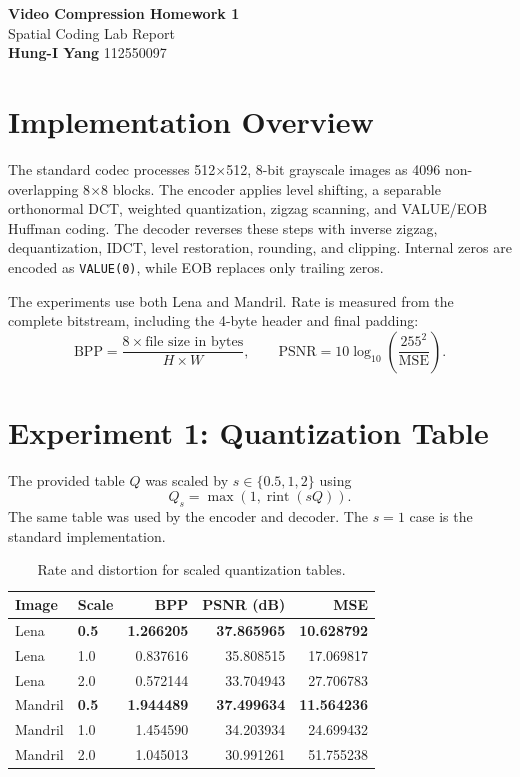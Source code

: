 \documentclass[10pt,a4paper]{article}
\begin{document}
\begin{center}
    {\LARGE\bfseries Video Compression Homework 1}\\[0.25em]
    {\large Spatial Coding Lab Report}\\[0.5em]
    \textbf{Hung-I Yang} \hspace{1em} 112550097
\end{center}

\section{Implementation Overview}

The standard codec processes 512$\times$512, 8-bit grayscale images as 4096 non-overlapping 8$\times$8 blocks. The encoder applies level shifting, a separable orthonormal DCT, weighted quantization, zigzag scanning, and VALUE/EOB Huffman coding. The decoder reverses these steps with inverse zigzag, dequantization, IDCT, level restoration, rounding, and clipping. Internal zeros are encoded as \texttt{VALUE(0)}, while EOB replaces only trailing zeros.

The experiments use both Lena and Mandril. Rate is measured from the complete bitstream, including the 4-byte header and final padding:
\[
    \mathrm{BPP}=\frac{8\times\text{file size in bytes}}{H\times W},
    \qquad
    \mathrm{PSNR}=10\log_{10}\!\left(\frac{255^2}{\mathrm{MSE}}\right).
\]

\section{Experiment 1: Quantization Table}

The provided table $Q$ was scaled by $s\in\{0.5,1,2\}$ using
\[
    Q_s=\max\!\left(1,\operatorname{rint}(sQ)\right).
\]
The same table was used by the encoder and decoder. The $s=1$ case is the standard implementation.

\begin{table}[ht]
\centering
\small
\begin{tabular}{llrrr}
\toprule
Image & Scale & BPP & PSNR (dB) & MSE \\
\midrule
Lena    & \textbf{0.5} & \textbf{1.266205} & \textbf{37.865965} & \textbf{10.628792} \\
Lena    & 1.0 & 0.837616 & 35.808515 & 17.069817 \\
Lena    & 2.0 & 0.572144 & 33.704943 & 27.706783 \\
\midrule
Mandril & \textbf{0.5} & \textbf{1.944489} & \textbf{37.499634} & \textbf{11.564236} \\
Mandril & 1.0 & 1.454590 & 34.203934 & 24.699432 \\
Mandril & 2.0 & 1.045013 & 30.991261 & 51.755238 \\
\bottomrule
\end{tabular}
\caption{Rate and distortion for scaled quantization tables.}
\end{table}
\end{document}
